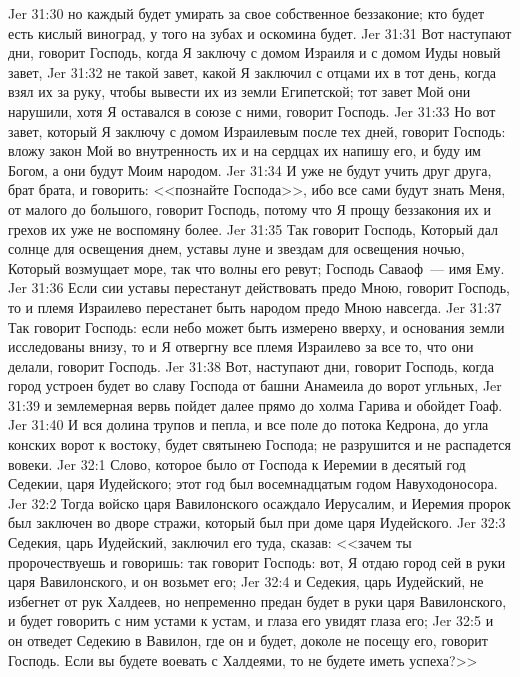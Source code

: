 \vs Jer 31:30 но каждый будет умирать за свое собственное беззаконие; кто будет есть кислый виноград, у того на зубах и оскомина будет.
\rsbpar\vs Jer 31:31 Вот наступают дни, говорит Господь, когда Я заключу с домом Израиля и с домом Иуды новый завет,
\vs Jer 31:32 не такой завет, какой Я заключил с отцами их в тот день, когда взял их за руку, чтобы вывести их из земли Египетской; тот завет Мой они нарушили, хотя Я оставался в союзе с ними, говорит Господь.
\vs Jer 31:33 Но вот завет, который Я заключу с домом Израилевым после тех дней, говорит Господь: вложу закон Мой во внутренность их и на сердцах их напишу его, и буду им Богом, а они будут Моим народом.
\vs Jer 31:34 И уже не будут учить друг друга, брат брата, и говорить: <<познайте Господа>>, ибо все сами будут знать Меня, от малого до большого, говорит Господь, потому что Я прощу беззакония их и грехов их уже не воспомяну более.
\vs Jer 31:35 Так говорит Господь, Который дал солнце для освещения днем, уставы луне и звездам для освещения ночью, Который возмущает море, так что волны его ревут; Господь Саваоф~--- имя Ему.
\vs Jer 31:36 Если сии уставы перестанут действовать предо Мною, говорит Господь, то и племя Израилево перестанет быть народом предо Мною навсегда.
\vs Jer 31:37 Так говорит Господь: если небо может быть измерено вверху, и основания земли исследованы внизу, то и Я отвергну все племя Израилево за все то, что они делали, говорит Господь.
\vs Jer 31:38 Вот, наступают дни, говорит Господь, когда город устроен будет во славу Господа от башни Анамеила до ворот угльных,
\vs Jer 31:39 и землемерная вервь пойдет далее прямо до холма Гарива и обойдет Гоаф.
\vs Jer 31:40 И вся долина трупов и пепла, и все поле до потока Кедрона, до угла конских ворот к востоку, будет святынею Господа; не разрушится и не распадется вовеки.
\vs Jer 32:1 Слово, которое было от Господа к Иеремии в десятый год Седекии, царя Иудейского; этот год был восемнадцатым годом Навуходоносора.
\vs Jer 32:2 Тогда войско царя Вавилонского осаждало Иерусалим, и Иеремия пророк был заключен во дворе стражи, который был при доме царя Иудейского.
\vs Jer 32:3 Седекия, царь Иудейский, заключил его туда, сказав: <<зачем ты пророчествуешь и говоришь: так говорит Господь: вот, Я отдаю город сей в руки царя Вавилонского, и он возьмет его;
\vs Jer 32:4 и Седекия, царь Иудейский, не избегнет от рук Халдеев, но непременно предан будет в руки царя Вавилонского, и будет говорить с ним устами к устам, и глаза его увидят глаза его;
\vs Jer 32:5 и он отведет Седекию в Вавилон, где он и будет, доколе не посещу его, говорит Господь. Если вы будете воевать с Халдеями, то не будете иметь успеха?>>
